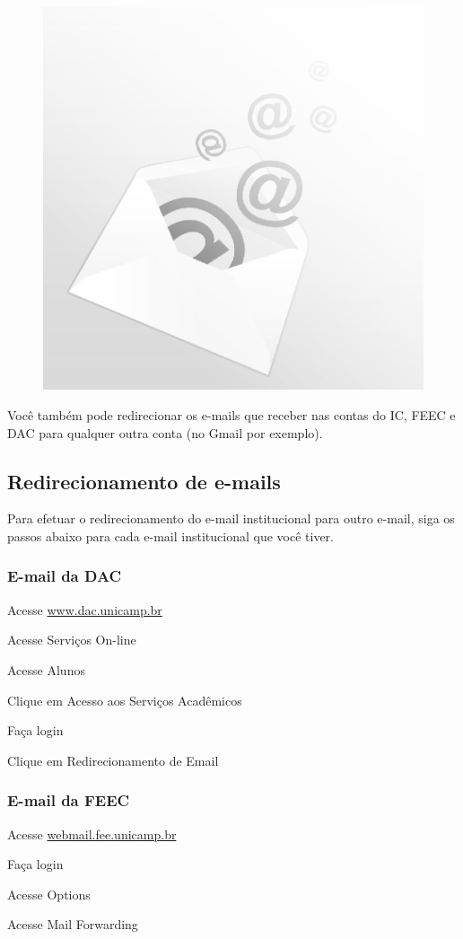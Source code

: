 \begin{figure}[b!]
    \centering
    \includegraphics[width=.3\textwidth]{img/alem_da_graduacao/email.jpg}
\end{figure}
Você também pode redirecionar os e-mails que receber nas contas do IC, FEEC e
DAC para qualquer outra conta (no Gmail por exemplo).

\subsection{Redirecionamento de e-mails}
Para efetuar o redirecionamento do e-mail institucional para outro e-mail, siga
os passos abaixo para cada e-mail institucional que você tiver.

\subsubsection*{E-mail da DAC}

\begin{compactenumerate}
    \item  Acesse \url{www.dac.unicamp.br}
    \item  Acesse Serviços On-line
    \item  Acesse Alunos
    \item  Clique em Acesso aos Serviços Acadêmicos
    \item  Faça login
    \item  Clique em Redirecionamento de Email
\end{compactenumerate}

\subsubsection*{E-mail da FEEC}

\begin{compactenumerate}
    \item  Acesse \url{webmail.fee.unicamp.br}
    \item  Faça login
    \item  Acesse Options
    \item  Acesse Mail Forwarding
\end{compactenumerate}

